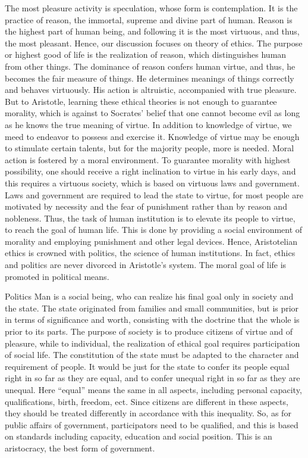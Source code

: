 \documentclass[11pt]{article}
\begin{document}
  The most pleasure activity is speculation, whose form is contemplation. It is the practice of reason, the immortal, supreme and divine part of human. Reason is the highest part of human being, and following it is the most virtuous, and thus, the most pleasant. 
  Hence, our discussion focuses on theory of ethics. The purpose or highest good of life is the realization of reason, which distinguishes human from other things. The dominance of reason confers human virtue, and thus, he becomes the fair measure of things. He determines meanings of things correctly and behaves virtuously. His action is altruistic, accompanied with true pleasure. But to Aristotle, learning these ethical theories is not enough to guarantee morality, which is against to Socrates’ belief that one cannot become evil as long as he knows the true meaning of virtue. In addition to knowledge of virtue, we meed to endeavor to possess and exercise it. Knowledge of virtue may be enough to stimulate certain talents, but for the majority people, more is needed. Moral action is fostered by a moral environment. To guarantee morality with highest possibility, one should receive a right inclination to virtue in his early days, and this requires a virtuous society, which is based on virtuous laws and government. Laws and government are required to lead the state to virtue, for most people are motivated by necessity and the fear of punishment rather than by reason and nobleness.
  Thus, the task of human institution is to elevate its people to virtue, to reach the goal of human life. This is done by providing a social environment of morality and employing punishment and other legal devices. Hence, Aristotelian ethics is crowned with politics, the science of human institutions. In fact, ethics and politics are never divorced in Aristotle’s system. The moral goal of life is promoted in political means.

Politics
  Man is a social being, who can realize his final goal only in society and the state. The state originated from families and small communities, but is prior in terms of significance and worth, consisting with the doctrine that the whole is prior to its parts. The purpose of society is to produce citizens of virtue and of pleasure, while to individual, the realization of ethical goal requires participation of social life. 
  The constitution of the state must be adapted to the character and requirement of people. It would be just for the state to confer its people equal right in so far as they are equal, and to confer unequal right in so far as they are unequal. Here “equal” means the same in all aspects, including personal capacity, qualifications, birth, freedom, ect. Since citizens are different in these aspects, they should be treated differently in accordance with this inequality. So, as for public affairs of government, participators need to be qualified, and this is based on standards including capacity, education and social position. This is an aristocracy, the best form of government. 
\end{document}

